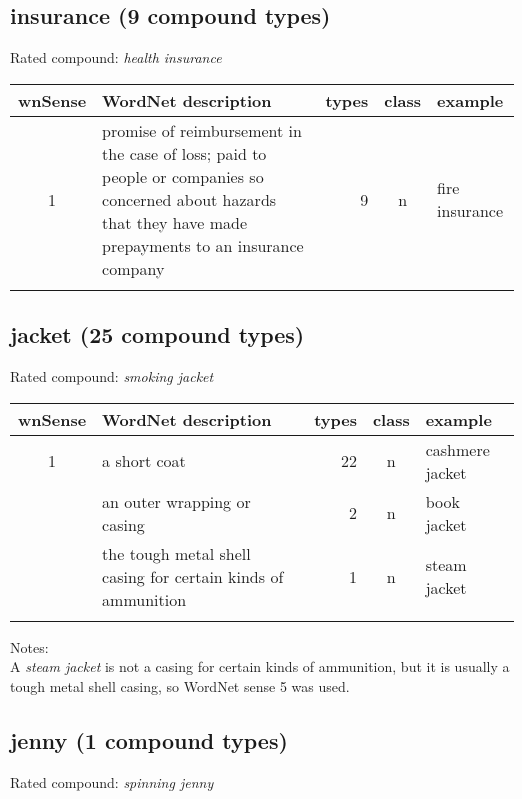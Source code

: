 \subsection{insurance (9 compound types)}
Rated compound: \emph{health insurance}


\noindent
\begin{longtable}{c>{\raggedright\arraybackslash}p{5cm}rc>{\raggedright\arraybackslash}p{2cm}}\lsptoprule
{\small wnSense}&WordNet description&types&class&example\\\midrule
1&promise of reimbursement in the case of loss; paid to people or companies so concerned about hazards that they have made prepayments to an insurance company&9&n&fire insurance\\\lspbottomrule
\end{longtable}

\subsection{jacket    (25 compound types)}
Rated compound: \emph{smoking jacket}


\noindent
\begin{longtable}{c>{\raggedright\arraybackslash}p{5cm}rc>{\raggedright\arraybackslash}p{2cm}}\lsptoprule
{\small wnSense}&WordNet description&types&class&example\\\midrule
1&a short coat&22&n&cashmere jacket\\\tablevspace
2&an outer wrapping or casing&2&n&book jacket\\\tablevspace
5&the tough metal shell casing for certain kinds of ammunition&1&n&steam jacket\\\lspbottomrule
\end{longtable}

\noindent
Notes:\\
A \emph{steam jacket} is not a casing for certain kinds of ammunition, but it is usually a tough metal shell casing, so WordNet sense 5 was used.
\subsection{jenny     (1 compound types)}
Rated compound: \emph{spinning jenny}

\vspace*{1ex}

